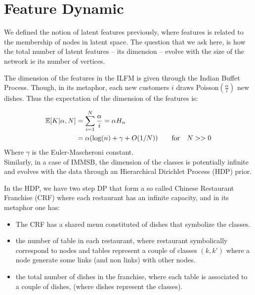 \section{Feature Dynamic}
\label{sec:dynamic}

We defined the notion of latent features previously, where features is related to the membership of nodes in latent space.  The question that we ask here, is how the total number of latent features -- its dimension -- evolve with the size of the network ie its number of vertices.


The dimension of the features in the ILFM is given through the Indian Buffet Process. Though, in its metaphor, each new customers $i$ draws Poisson$(\frac{\alpha}{i})$ new dishes. Thus the expectation of the dimension of the features is:

\begin{align*}
\mathbb{E}[K|\alpha, N] &=  \sum_{i=1}^N \frac{\alpha}{i} = \alpha H_n \\
&= \alpha(\log(n) + \gamma +O(1/N) ) \qquad  \textnormal{for} \quad N >> 0
\end{align*}
Where $\gamma$ is the Euler-Mascheroni constant.\\

Similarly, in a case of IMMSB, the dimension of the classes is potentially infinite and evolves with the data through an Hierarchical Dirichlet Process (HDP) prior.

In the HDP, we have two step DP that form a so called Chinese Restaurant Franchise (CRF) where each restaurant has an infinite capacity, and in its metaphor one has:
\begin{itemize}
\item The CRF has a shared menu constituted of dishes that symbolize the classes.
\item the number of table in each restaurant, where restaurant symbolically correspond to nodes and tables represent a couple of classes $(k,k')$ where a node generate some links (and non links) with other nodes. 
\item the total number of dishes in the franchise, where each table is associated to a couple of dishes, (where dishes represent the classes).
\end{itemize}

